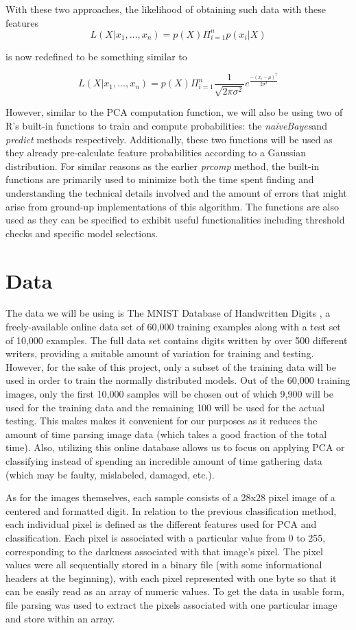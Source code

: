 \documentclass[twocolumn]{article}
\begin{document}
With these two approaches, the likelihood of obtaining such data with these features
$$L(X | x_1,\ldots, x_n ) = p(X) \Pi_{i=1}^{n}p(x_i | X)$$

is now redefined to be something similar to

$$L(X |  x_1,\ldots, x_n ) = p(X) \Pi_{i=1}^{n} \frac{1}{\sqrt{2 \pi \sigma^2}}  e^\frac{-(x_i - \mu)^2}{2 \sigma^2}$$

However, similar to the PCA computation function, we will also be using two of R's built-in functions to train and compute probabilities: the \emph{naiveBayes}and \emph{predict} methods respectively. Additionally, these two functions will be used as they already pre-calculate feature probabilities according to a Gaussian distribution. For similar reasons as the earlier \emph{prcomp} method, the built-in functions are primarily used to minimize both the time spent finding and understanding the technical details involved and the amount of errors that might arise from ground-up implementations of this algorithm. The functions are also used as they can be specified to exhibit useful functionalities including threshold checks and specific model selections.


\section{Data} %
\label{sec:data}
The data we will be using is The MNIST Database of Handwritten Digits \cite{mnist}
, a freely-available online data set of 60,000 training examples along with a test set of 10,000 examples. The full data set contains digits written by over 500 different writers, providing a suitable amount of variation for training and testing. However, for the sake of this project, only a subset of the training data will be used in order to train the normally distributed models. Out of the 60,000 training images, only the first 10,000 samples will be chosen out of which 9,900 will be used for the training data and the remaining 100 will be used for the actual testing. This makes makes it convenient for our purposes as it reduces the amount of time parsing image data (which takes a good fraction of the total time). Also, utilizing this online database allows us to focus on applying PCA or classifying instead of spending an incredible amount of time gathering data (which may be faulty, mislabeled, damaged, etc.). 

As for the images themselves, each sample consists of a 28x28 pixel image of a centered and formatted digit. In relation to the previous classification method, each individual pixel is defined as the different features used for PCA and classification. Each pixel is associated with a particular value from 0 to 255, corresponding to the darkness associated with that image's pixel. The pixel values were all sequentially stored in a binary file (with some informational headers at the beginning), with each pixel represented with one byte so that it can be easily read as an array of numeric values. To get the data in usable form, file parsing was used to extract the pixels associated with one particular image and store within an array.
\end{document}
